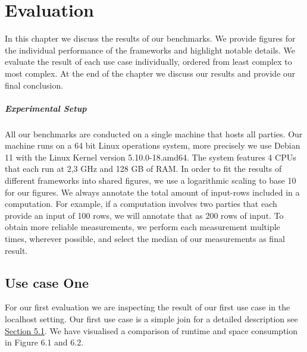 \chapter{Evaluation}
\label{Evaluation}	
In this chapter we discuss the results of our benchmarks. We provide figures for the individual performance of the frameworks and highlight notable details. We evaluate the result of each use case individually, ordered from least complex to most complex. At the end of the chapter we discuss our results and provide our final conclusion.
\paragraph{Experimental Setup}
All our benchmarks are conducted on a single machine that hosts all parties. Our machine runs on a 64 bit Linux operations system, more precisely we use Debian 11 with the Linux Kernel version 5.10.0-18.amd64. The system features 4 CPUs that each run at 2,3 GHz and 128 GB of RAM. In order to fit the results of different frameworks into shared figures, we use a logarithmic scaling to base 10 for our figures. We always annotate the total amount of input-rows included in a computation. For example, if a computation involves two parties that each provide an input of 100 rows, we will annotate that as 200 rows of input. To obtain more reliable measurements, we perform each measurement multiple times, wherever possible, and select the median of our measurements as final result.
\section{Use case One}
For our first evaluation we are inspecting the result of our first use case in the localhost setting. Our first use case is a simple join for a detailed description see \hyperref[Use Case]{Section 5.1}. We have visualised a comparison of runtime and space consumption in Figure 6.1 and 6.2.

